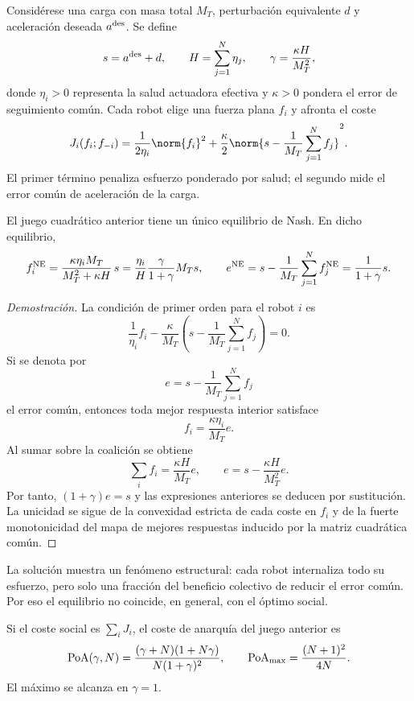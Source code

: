 Considérese una carga con masa total $M_T$, perturbación equivalente $d$ y aceleración
deseada $a^{\rm des}$. Se define
\[
  s=a^{\rm des}+d,\qquad
  H=\sum_{j=1}^N \eta_j,\qquad
  \gamma=\frac{\kappa H}{M_T^2},
\]
donde $\eta_i>0$ representa la salud actuadora efectiva y $\kappa>0$ pondera el error de
seguimiento común. Cada robot elige una fuerza plana $f_i$ y afronta el coste
\[
  J_i(f_i;f_{-i})=
  \frac{1}{2\eta_i}\norm{f_i}^2+
  \frac{\kappa}{2}
  \norm{s-\frac{1}{M_T}\sum_{j=1}^N f_j}^2 .
\]
El primer término penaliza esfuerzo ponderado por salud; el segundo mide el error común
de aceleración de la carga.

\begin{proposicion}
El juego cuadrático anterior tiene un único equilibrio de Nash. En dicho equilibrio,
\[
  f_i^{\rm NE}=
  \frac{\kappa \eta_i M_T}{M_T^2+\kappa H}\,s
  =
  \frac{\eta_i}{H}\frac{\gamma}{1+\gamma}M_Ts,
  \qquad
  e^{\rm NE}=s-\frac{1}{M_T}\sum_{j=1}^N f_j^{\rm NE}
  =\frac{1}{1+\gamma}s .
\]
\end{proposicion}

\begin{proof}[Demostración]
La condición de primer orden para el robot $i$ es
\[
  \frac{1}{\eta_i}f_i
  -\frac{\kappa}{M_T}
  \left(s-\frac{1}{M_T}\sum_{j=1}^N f_j\right)=0 .
\]
Si se denota por
\[
  e=s-\frac{1}{M_T}\sum_{j=1}^N f_j
\]
el error común, entonces toda mejor respuesta interior satisface
\[
  f_i=\frac{\kappa\eta_i}{M_T}e .
\]
Al sumar sobre la coalición se obtiene
\[
  \sum_i f_i=\frac{\kappa H}{M_T}e,
  \qquad
  e=s-\frac{\kappa H}{M_T^2}e.
\]
Por tanto, $(1+\gamma)e=s$ y las expresiones anteriores se deducen por sustitución. La
unicidad se sigue de la convexidad estricta de cada coste en $f_i$ y de la fuerte
monotonicidad del mapa de mejores respuestas inducido por la matriz cuadrática común.
\end{proof}

La solución muestra un fenómeno estructural: cada robot internaliza todo su esfuerzo,
pero solo una fracción del beneficio colectivo de reducir el error común. Por eso el
equilibrio no coincide, en general, con el óptimo social.

\begin{proposicion}
Si el coste social es $\sum_i J_i$, el coste de anarquía del juego anterior es
\[
  {\rm PoA}(\gamma,N)=
  \frac{(\gamma+N)(1+N\gamma)}
  {N(1+\gamma)^2},
  \qquad
  {\rm PoA}_{\max}=\frac{(N+1)^2}{4N}.
\]
El máximo se alcanza en $\gamma=1$.
\end{proposicion}

